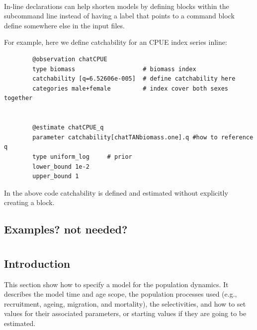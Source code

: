 \paragraph*{\label{sec:declare}}


In-line declarations can help shorten models by defining \command{} blocks within the subcommand line instead of having a label that points to a command block define somewhere else in the input files.

For example, here we define catchability for an CPUE index series inline:

{\small{\begin{verbatim}
		@observation chatCPUE
		type biomass                   # biomass index
		catchability [q=6.52606e-005]  # define catchability here
		categories male+female         # index cover both sexes together


		@estimate chatCPUE_q
		parameter catchability[chatTANbiomass.one].q #how to reference q
		type uniform_log     # prior
		lower_bound 1e-2
		upper_bound 1
		\end{verbatim}}}

In the above code catchability is defined and estimated without explicitly creating a  block.
\subsection{Examples? not needed?}

\section{\label{sec:population-section}}

\subsection{Introduction}

This section show how to specify a model for the population dynamics. It describes the model time and age scope, the population processes used (e.g., recruitment, ageing, migration, and mortality), the selectivities, and how to set values for their associated parameters, or starting values if they are going to be estimated.


